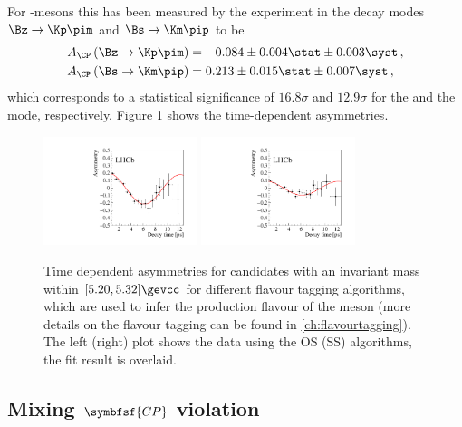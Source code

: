 For \B-mesons this has been measured by the \lhcb experiment in the decay modes $\Bz\to\Kp\pim$ and $\Bs\to\Km\pip$ \cite{LHCb-PAPER-2013-018} to be
\begin{equation}
\begin{split}
A_{\CP}\left(\Bz\to\Kp\pim\right) &= -0.084\pm0.004\stat \pm 0.003\syst\,,\\
A_{\CP}\left(\Bs\to\Km\pip\right) &= 0.213\pm0.015\stat \pm 0.007\syst\,,
\end{split}
\end{equation}
which corresponds to a statistical significance of $16.8\sigma$ and $12.9\sigma$ for the \Bz and the \Bs mode, respectively.
Figure \ref{fig:DirectCPV} shows the time-dependent asymmetries.
\begin{figure}[tbp]
	\centering
	\includegraphics[width=0.4\textwidth]{03CPV/figs/DirectCPV_1.pdf}
	\includegraphics[width=0.4\textwidth]{03CPV/figs/DirectCPV_2.pdf}
	\caption{Time dependent asymmetries for \Kp\pim candidates with an invariant mass within $[5.20, 5.32]\gevcc$ for different flavour tagging algorithms, which are used to infer the production flavour of the \Bq meson (more details on the flavour tagging can be found in \cref{ch:flavourtagging}). The left (right) plot shows the data using the OS (SS) algorithms, the fit result is overlaid.}
	\label{fig:DirectCPV}
\end{figure}


\subsection[head={Mixing \CP violation},tocentry={Mixing \CP violation}]{Mixing $\symbfsf{C{}P}$ violation}
\label{sec:MixingCPV}

